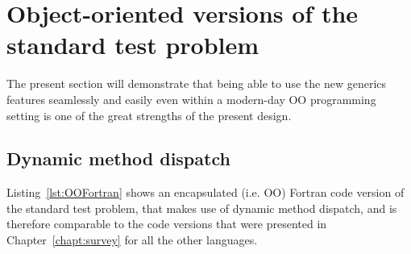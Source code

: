 \documentclass[11pt,oneside]{report}
\begin{document}



\section{Object-oriented versions of the standard test problem}

The present section will demonstrate that being able to use the new
generics features seamlessly and easily even within a modern-day OO
programming setting is one of the great strengths of the present
design.

\subsection{Dynamic method dispatch}
\label{sect:Fortran_dynamic_dispatch}

Listing~\ref{lst:OOFortran} shows an encapsulated (i.e. OO) Fortran
code version of the standard test problem, that makes use of dynamic
method dispatch, and is therefore comparable to the code versions that
were presented in Chapter~\ref{chapt:survey} for all the other
languages.
\end{document}
